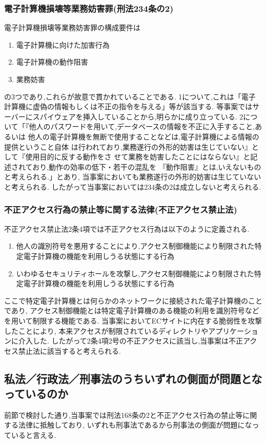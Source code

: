 \documentclass[uplatex,a4j,11pt,dvipdfmx]{jsarticle}
\begin{document}
\subsubsection*{電子計算機損壊等業務妨害罪(刑法234条の2)}
電子計算機損壊等業務妨害罪の構成要件は
\begin{enumerate}
  \item 電子計算機に向けた加害行為
  \item 電子計算機の動作阻害
  \item 業務妨害
\end{enumerate}
の3つであり,これらが故意で貫かれていることである.\cite{IPAwagakuni:online}
1について,これは「電子計算機に虚偽の情報もしくは不正の指令を与える」等が該当する.\cite{IPAwagakuni:online}
等事案ではサーバーにスパイウェアを挿入していることから,明らかに成り立っている.
2について「『他人のパスワードを用いて,データベースの情報を不正に入手すること,あるいは
他人の電子計算機を無断で使用することなどは,電子計算機による情報の提供ということ自体
は行われており,業務遂行の外形的妨害は生じていない』として『使用目的に反する動作をさ
せて業務を妨害したことにはならない』と記述されており,動作の効率の低下・若干の混乱を
『動作阻害』とは,いえないものと考えられる.」\cite{IPAwagakuni:online}とあり,
当事案においても業務遂行の外形的妨害は生じていないと考えられる.
したがって当事案においては234条の2は成立しないと考えられる.
\subsubsection*{不正アクセス行為の禁止等に関する法律(不正アクセス禁止法)}
不正アクセス禁止法2条4項では不正アクセス行為は以下のように定義される.\cite{1kaisets92:online}
\begin{enumerate}
  \item 他人の識別符号を悪用することにより,アクセス制御機能により制限された特定電子計算機の機能を利用しうる状態にする行為
  \item いわゆるセキュリティホールを攻撃し,アクセス制御機能により制限された特定電子計算機の機能を利用しうる状態にする行為
\end{enumerate}
ここで特定電子計算機とは何らかのネットワークに接続された電子計算機のことであり,
アクセス制御機能とは特定電子計算機のある機能の利用を識別符号などを用いて制限する機能である.
当事案においてECサイトに内在する脆弱性を攻撃したことにより,
本来アクセスが制限されているディレクトリやアプリケーションに介入した.
したがって2条4項2号の不正アクセスに該当し,当事案は不正アクセス禁止法に該当すると考えられる.
\subsection*{私法／行政法／刑事法のうちいずれの側面が問題となっているのか}
前節で検討した通り,当事案では刑法168条の2と不正アクセス行為の禁止等に関する法律に抵触しており,
いずれも刑事法であるから刑事法の側面が問題になっていると言える.

\end{document}
